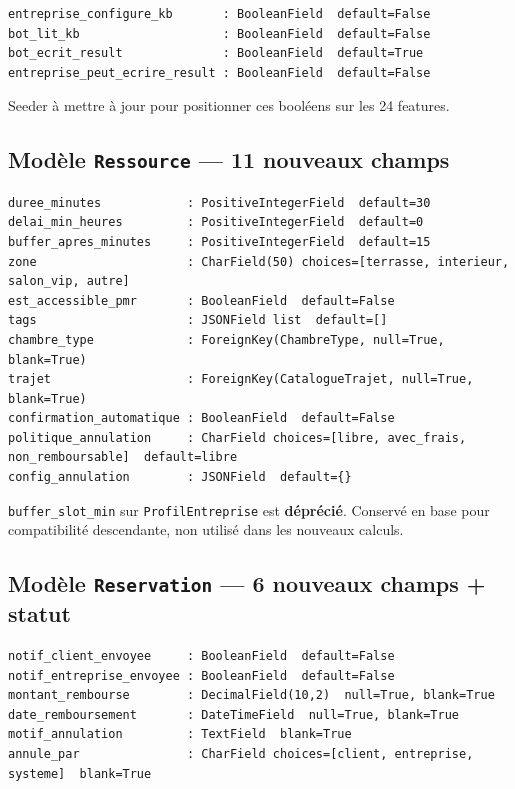 \documentclass[11pt,a4paper]{article}
\newcommand{\slug}[1]{\texttt{\color{AGTDark}#1}}
\begin{document}
\begin{lstlisting}
entreprise_configure_kb       : BooleanField  default=False
bot_lit_kb                    : BooleanField  default=False
bot_ecrit_result              : BooleanField  default=True
entreprise_peut_ecrire_result : BooleanField  default=False
\end{lstlisting}

Seeder à mettre à jour pour positionner ces booléens sur les 24 features.

\subsection{Modèle \slug{Ressource} — 11 nouveaux champs}

\begin{lstlisting}
duree_minutes            : PositiveIntegerField  default=30
delai_min_heures         : PositiveIntegerField  default=0
buffer_apres_minutes     : PositiveIntegerField  default=15
zone                     : CharField(50) choices=[terrasse, interieur, salon_vip, autre]
est_accessible_pmr       : BooleanField  default=False
tags                     : JSONField list  default=[]
chambre_type             : ForeignKey(ChambreType, null=True, blank=True)
trajet                   : ForeignKey(CatalogueTrajet, null=True, blank=True)
confirmation_automatique : BooleanField  default=False
politique_annulation     : CharField choices=[libre, avec_frais, non_remboursable]  default=libre
config_annulation        : JSONField  default={}
\end{lstlisting}

\begin{decisionbox}
\texttt{buffer\_slot\_min} sur \slug{ProfilEntreprise} est \textbf{déprécié}.
Conservé en base pour compatibilité descendante, non utilisé dans les nouveaux calculs.
\end{decisionbox}

\subsection{Modèle \slug{Reservation} — 6 nouveaux champs + statut}

\begin{lstlisting}
notif_client_envoyee     : BooleanField  default=False
notif_entreprise_envoyee : BooleanField  default=False
montant_rembourse        : DecimalField(10,2)  null=True, blank=True
date_remboursement       : DateTimeField  null=True, blank=True
motif_annulation         : TextField  blank=True
annule_par               : CharField choices=[client, entreprise, systeme]  blank=True
\end{lstlisting}
\end{document}
